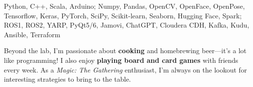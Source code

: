 \documentclass[10pt,a4paper,ragged2e]{altacv}
\begin{document}
    \divider    
    
    
\clearpage

\begin{fullwidth}

  \printbibliography[heading=pubtype,title=\empty, type=misc]

  \nocite{*}

  \printbibliography[heading=pubtype,title={\printinfo{\faFileTextO}{Journal}}, type=article]
  \divider

  \printbibliography[heading=pubtype,title={\printinfo{\faFileTextO}{Conference Proceedings}}, type=inproceedings]

  \divider

  Python, C++, Scala, Arduino; Numpy, Pandas, OpenCV, OpenFace, OpenPose, Tensorflow, Keras, PyTorch, SciPy, Scikit-learn, Seaborn, Hugging Face, Spark; ROS1, ROS2, YARP, PyQt5/6, Jamovi, ChatGPT, Cloudera CDH, Kafka, Kudu, Ansible, Terraform

  Beyond the lab, I'm passionate about \textbf{cooking} and homebrewing beer—it’s a lot like programming! I also enjoy \textbf{playing board and card games} with friends every week. As a \textit{Magic: The Gathering} enthusiast, I'm always on the lookout for interesting strategies to bring to the table.

\end{fullwidth}
\end{document}
